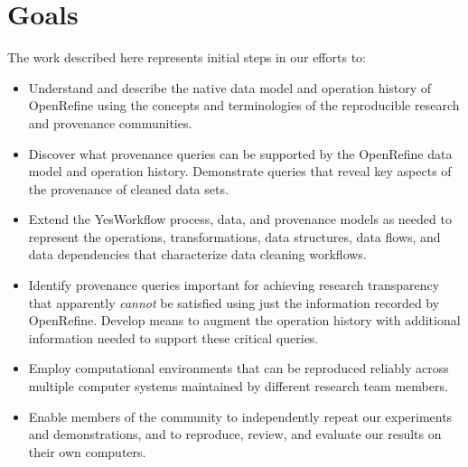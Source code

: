 \section{Goals}

The work described here represents initial steps in our efforts to:

\begin{itemize}[label=\raisebox{0.25ex}{\tiny$\bullet$}]

\item Understand and describe the native data model and operation history of OpenRefine using the concepts and terminologies of the reproducible research and provenance communities.

\item Discover what provenance queries can be supported by the OpenRefine data model and operation history.  Demonstrate queries that reveal key aspects of the provenance of cleaned data sets.

\item Extend the YesWorkflow \cite{mcphillips2015yesworkflowa, yw-website} process, data, and provenance models as needed to represent the operations, transformations, data structures, data flows, and data dependencies that characterize data cleaning workflows.  


\item Identify provenance queries important for achieving research transparency that apparently \emph{cannot} be satisfied using just the information recorded by OpenRefine. Develop means to augment the operation history with additional information needed to support these critical queries.

\item Employ computational environments that can be reproduced reliably across multiple computer systems maintained by different research team members. 

\item Enable members of the community to independently repeat our experiments and demonstrations, and to reproduce, review, and evaluate our results on their own computers.

\end{itemize}
